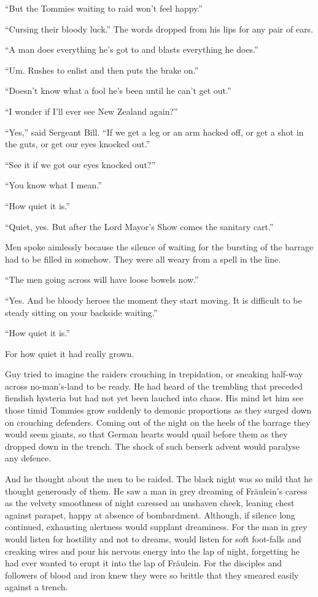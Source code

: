 ``But the Tommies waiting to raid won't feel happy.''

``Cursing their bloody luck.'' The words dropped from his lips for any pair of ears.

``A man does everything he's got to and blasts everything he does.''

``Um. Rushes to enlist and then puts the brake on.''

``Doesn't know what a fool he's been until he can't get out.''

``I wonder if I'll ever see New Zealand again?''

``Yes,'' said Sergeant Bill. ``If we get a leg or an arm hacked off, or get a shot in the guts, or get our eyes knocked out.''

``See it if we got our eyes knocked out?''

``You know what I mean.''

``How quiet it is.''

``Quiet, yes. But after the Lord Mayor's Show comes the sanitary cart.''

Men spoke aimlessly because the silence of waiting for the bursting of the barrage had to be filled in somehow. They were all weary from a spell in the line.

``The men going across will have loose bowels now.''

``Yes. And be bloody heroes the moment they start moving. It is difficult to be steady sitting on your backside waiting.''

``How quiet it is.''

For how quiet it had really grown.

Guy tried to imagine the raiders crouching in trepidation, or sneaking half-way across no-man's-land to be ready. He had heard of the trembling that preceded fiendish hysteria but had not yet been lauched into chaos. His mind let him see those timid Tommies grow suddenly to demonic proportions as they surged down on crouching defenders. Coming out of the night on the heels of the barrage they would seem giants, so that German hearts would quail before them as they dropped down in the trench. The shock of such berserk advent would paralyse any defence.

And he thought about the men to be raided. The black night was so mild that he thought generously of them. He saw a man in grey dreaming of Fr\"{a}ulein's caress as the velvety smoothness of night caressed an unshaven cheek, leaning chest against parapet, happy at absence of bombardment. Although, if silence long continued, exhausting alertness would supplant dreaminess. For the man in grey would listen for hostility and not to dreams, would listen for soft foot-falls and creaking wires and pour his nervous energy into the lap of night, forgetting he had ever wanted to erupt it into the lap of Fr\"{a}ulein. For the disciples and followers of blood and iron knew they were so brittle that they smeared easily against a trench.

